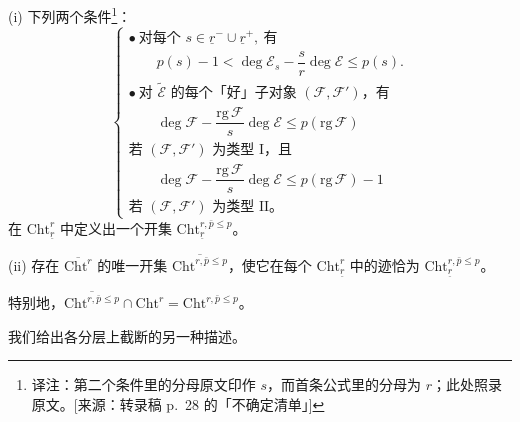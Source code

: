
\begin{lemma*}
(i) 下列两个条件\footnote{译注：第二个条件里的分母原文印作 $s$，而首条公式里的分母为 $r$；此处照录原文。[来源：转录稿 p.~28 的「不确定清单」]}：
\[
\left\{
\begin{array}{l}
\bullet\ \text{对每个 } s\in\underline{r}^{-}\cup\underline{r}^{+},\ \text{有}\\[6pt]
\qquad p(s)-1<\deg\mathcal{E}_{s}-\dfrac{s}{r}\deg\mathcal{E}\le p(s).\\[10pt]
\bullet\ \text{对 }\tilde{\mathcal{E}}\text{ 的每个「好」子对象 }(\mathcal{F},\mathcal{F}')\text{，有}\\[6pt]
\qquad \deg\mathcal{F}-\dfrac{\mathrm{rg}\,\mathcal{F}}{s}\deg\mathcal{E}\le p(\mathrm{rg}\,\mathcal{F})\\[6pt]
\text{若 }(\mathcal{F},\mathcal{F}')\text{ 为类型 I，且}\\[10pt]
\qquad \deg\mathcal{F}-\dfrac{\mathrm{rg}\,\mathcal{F}}{s}\deg\mathcal{E}\le p(\mathrm{rg}\,\mathcal{F})-1\\[6pt]
\text{若 }(\mathcal{F},\mathcal{F}')\text{ 为类型 II。}
\end{array}
\right.
\]
在 $\mathrm{Cht}^{r}_{\underline{r}}$ 中定义出一个开集 $\mathrm{Cht}^{r,\bar{p}\le p}_{\underline{r}}$。

(ii) 存在 $\overline{\mathrm{Cht}^{r}}$ 的唯一开集 $\overline{\mathrm{Cht}^{r,\bar{p}\le p}}$，使它在每个 $\mathrm{Cht}^{r}_{\underline{r}}$ 中的迹恰为 $\mathrm{Cht}^{r,\bar{p}\le p}_{\underline{r}}$。
\end{lemma*}

\begin{remark*}
特别地，$\overline{\mathrm{Cht}^{r,\bar{p}\le p}}\cap\mathrm{Cht}^{r}=\mathrm{Cht}^{r,\bar{p}\le p}$。
\end{remark*}

我们给出各分层上截断的另一种描述。

